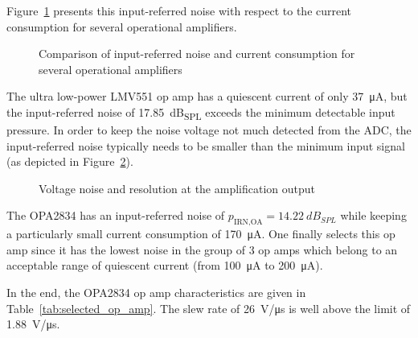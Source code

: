 \documentclass{EPL-master-thesis-covers-EN}
\newcommand{\te}[1]{\textrm{#1}}
\begin{document}
Figure~\ref{fig:output_noise_op_amp} presents this input-referred noise with respect to the current consumption for several operational amplifiers.

\begin{figure}[H]
    \centering
    
    \caption{Comparison of input-referred noise and current consumption for several operational amplifiers}
    \label{fig:output_noise_op_amp}
\end{figure}

The ultra low-power LMV551 op amp has a quiescent current of only \SI{37}{\micro A}, but the input-referred noise of \SI{17.85}{dB_{SPL}} exceeds the minimum detectable input pressure.
In order to keep the noise voltage not much detected from the ADC, the input-referred noise typically needs to be smaller than the minimum input signal (as depicted in Figure~\ref{fig:ADC_res_noise}).

\begin{figure}[H]
\centering
{}
\caption{Voltage noise and resolution at the amplification output}
\label{fig:ADC_res_noise}
\end{figure}

The OPA2834 has an input-referred noise of $p_\te{IRN,OA} = \SI{14.22}{dB_{SPL}}$ while keeping a particularly small current consumption of \SI{170}{\micro A}. One finally selects this op amp since it has the lowest noise in the group of 3 op amps which belong to an acceptable range of quiescent current (from \SI{100}{\micro A} to \SI{200}{\micro A}).


In the end, the OPA2834 op amp characteristics are given in Table~\ref{tab:selected_op_amp}. The slew rate of \SI{26}{V/\micro s} is well above the limit of \SI{1.88}{V/\micro s}.
\end{document}
